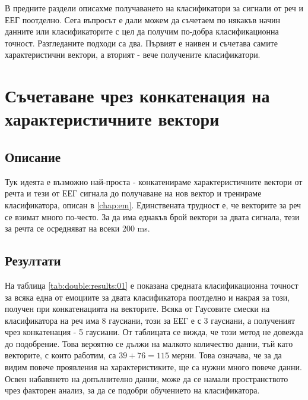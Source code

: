 \documentclass[main.tex]{subfiles}
\begin{document}
В предните раздели описахме получаването на класификатори за сигнали от реч и ЕЕГ поотделно. Сега въпросът е дали можем да съчетаем по някакъв начин данните или класификаторите с цел да получим по-добра класификационна точност. Разгледаните подходи са два. Първият е наивен и съчетава самите характеристични вектори, а вторият - вече получените класификатори.

\section{Съчетаване чрез конкатенация на характеристичните вектори}
\subsection{Описание}
Тук идеята е възможно най-проста - конкатенираме характеристичните вектори от речта и тези от ЕЕГ сигнала до получаване на нов вектор и тренираме класификатора, описан в \autoref{chap:em}. Единствената трудност е, че векторите за реч се взимат много по-често. За да има еднакъв брой вектори за двата сигнала, тези за речта се осредняват на всеки 200 ms.
\subsection{Резултати}
На таблица \autoref{tab:double:results:01} е показана средната класификационна точност за всяка една от емоциите за двата класификатора поотделно и накрая за този, получен при конкатенацията на векторите. Всяка от Гаусовите смески на класификатора на реч има 8 гаусиани, този за ЕЕГ е с 3 гаусиани, а полученият чрез конкатенация - 5 гаусиани. От таблицата се вижда, че този метод не довежда до подобрение. Това вероятно се дължи на малкото количество данни, тъй като векторите, с които работим, са $39 + 76 = 115$ мерни. Това означава, че за да видим повече проявления на характеристиките, ще са нужни много повече данни. Освен набавянето на допълнително данни, може да се намали пространството чрез факторен анализ, за да се подобри обучението на класификатора.
\end{document}
